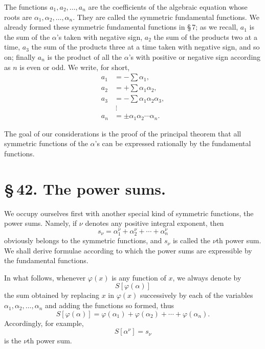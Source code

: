 \documentclass[11pt]{article}
\begin{document}
The functions $a_1,a_2,\ldots,a_n$ are the coefficients of the algebraic equation whose roots are $\alpha_1,\alpha_2,\ldots,\alpha_n$. They are called the symmetric fundamental functions. We already formed these symmetric fundamental functions in \S\,7; as we recall, $a_1$ is the sum of the $\alpha$'s taken with negative sign, $a_2$ the sum of the products two at a time, $a_3$ the sum of the products three at a time taken with negative sign, and so on; finally $a_n$ is the product of all the $\alpha$'s with positive or negative sign according as $n$ is even or odd. We write, for short,
\begin{equation}
\begin{aligned}
 a_1&=-\sum \alpha_1,\\
 a_2&=+\sum \alpha_1\alpha_2,\\
 a_3&=-\sum \alpha_1\alpha_2\alpha_3,\\
 &\ \vdots\\
 a_n&=\pm \alpha_1\alpha_2\cdots\alpha_n.
\end{aligned}
\tag{3}
\end{equation}

The goal of our considerations is the proof of the principal theorem that all symmetric functions of the $\alpha$'s can be expressed rationally by the fundamental functions.

\section*{\S\,42. The power sums.}

We occupy ourselves first with another special kind of symmetric functions, the power sums. Namely, if $\nu$ denotes any positive integral exponent, then
\begin{equation}
 s_\nu=\alpha_1^\nu+\alpha_2^\nu+\cdots+\alpha_n^\nu
\tag{1}
\end{equation}
obviously belongs to the symmetric functions, and $s_\nu$ is called the $\nu$th power sum. We shall derive formulae according to which the power sums are expressible by the fundamental functions.

In what follows, whenever $\varphi(x)$ is any function of $x$, we always denote by
\[
 S[\varphi(\alpha)]
\]
the sum obtained by replacing $x$ in $\varphi(x)$ successively by each of the variables $\alpha_1,\alpha_2,\ldots,\alpha_n$ and adding the functions so formed, thus
\[
 S[\varphi(\alpha)]=\varphi(\alpha_1)+\varphi(\alpha_2)+\cdots+\varphi(\alpha_n).
\]
Accordingly, for example,
\[
 S[\alpha^\nu]=s_\nu
\]
is the $\nu$th power sum.
\end{document}
